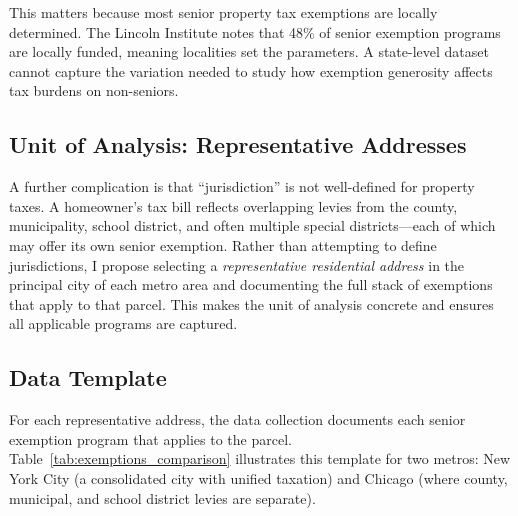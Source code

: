 \documentclass[11pt]{article}
\begin{document}
This matters because most senior property tax exemptions are locally determined. The Lincoln Institute notes that 48\% of senior exemption programs are locally funded, meaning localities set the parameters. A state-level dataset cannot capture the variation needed to study how exemption generosity affects tax burdens on non-seniors.

\subsection{Unit of Analysis: Representative Addresses}

A further complication is that ``jurisdiction'' is not well-defined for property taxes. A homeowner's tax bill reflects overlapping levies from the county, municipality, school district, and often multiple special districts---each of which may offer its own senior exemption. Rather than attempting to define jurisdictions, I propose selecting a \textit{representative residential address} in the principal city of each metro area and documenting the full stack of exemptions that apply to that parcel. This makes the unit of analysis concrete and ensures all applicable programs are captured.

\subsection{Data Template}

For each representative address, the data collection documents each senior exemption program that applies to the parcel. Table~\ref{tab:exemptions_comparison} illustrates this template for two metros: New York City (a consolidated city with unified taxation) and Chicago (where county, municipal, and school district levies are separate).
\end{document}
